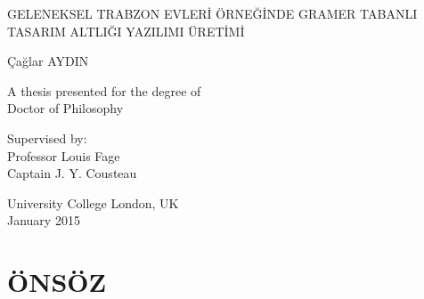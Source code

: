 \documentclass[12pt,turkish,a4paperpaper,]{report}
\date{}
\begin{document}
\begin{titlepage}
    \begin{center}


        \vspace*{2.5cm}

        \huge
        GELENEKSEL TRABZON EVLERİ ÖRNEĞİNDE GRAMER TABANLI TASARIM ALTLIĞI YAZILIMI ÜRETİMİ

        \vspace{1.5cm}

        \Large
        Çağlar AYDIN

        \vspace{1.5cm}

        \normalsize
        A thesis presented for the degree of\\
        Doctor of Philosophy

        \vfill

        \normalsize
        Supervised by:\\
        Professor Louis Fage\\
        Captain J. Y. Cousteau

        \vspace{0.8cm}


        \normalsize
        University College London, UK\\
        January 2015


    \end{center}
\end{titlepage}

\hypertarget{uxf6nsuxf6z}{%
\chapter*{ÖNSÖZ}\label{uxf6nsuxf6z}}

\setcounter{page}{3}
\end{document}
